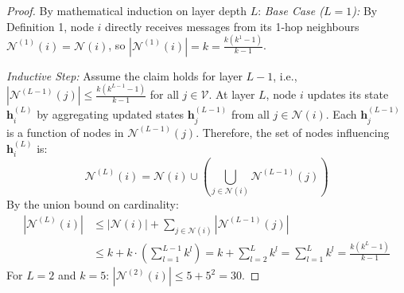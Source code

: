 \documentclass[letterpaper]{article}
\begin{document}
\begin{proof}
By mathematical induction on layer depth $L$:
\textit{Base Case ($L=1$):} By Definition 1, node $i$ directly receives messages from its 1-hop neighbours $\mathcal{N}^{(1)}(i) = \mathcal{N}(i)$, so $|\mathcal{N}^{(1)}(i)| = k = \frac{k(k^1 - 1)}{k - 1}$.

\textit{Inductive Step:} Assume the claim holds for layer $L-1$, i.e., $|\mathcal{N}^{(L-1)}(j)| \le \frac{k(k^{L-1} - 1)}{k - 1}$ for all $j \in \mathcal{V}$. At layer $L$, node $i$ updates its state $\mathbf{h}_i^{(L)}$ by aggregating updated states $\mathbf{h}_j^{(L-1)}$ from all $j \in \mathcal{N}(i)$. Each $\mathbf{h}_j^{(L-1)}$ is a function of nodes in $\mathcal{N}^{(L-1)}(j)$. Therefore, the set of nodes influencing $\mathbf{h}_i^{(L)}$ is:
\begin{equation}
\mathcal{N}^{(L)}(i) = \mathcal{N}(i) \cup \left( \bigcup_{j \in \mathcal{N}(i)} \mathcal{N}^{(L-1)}(j) \right)
\end{equation}
By the union bound on cardinality:
\begin{align}
|\mathcal{N}^{(L)}(i)| &\le |\mathcal{N}(i)| + \sum_{j \in \mathcal{N}(i)} |\mathcal{N}^{(L-1)}(j)| \\
&\le k + k \cdot \left( \sum_{l=1}^{L-1} k^l \right) = k + \sum_{l=2}^{L} k^l = \sum_{l=1}^L k^l = \frac{k(k^L - 1)}{k - 1}
\end{align}
For $L=2$ and $k=5$: $|\mathcal{N}^{(2)}(i)| \le 5 + 5^2 = 30$.
\end{proof}
\end{document}
